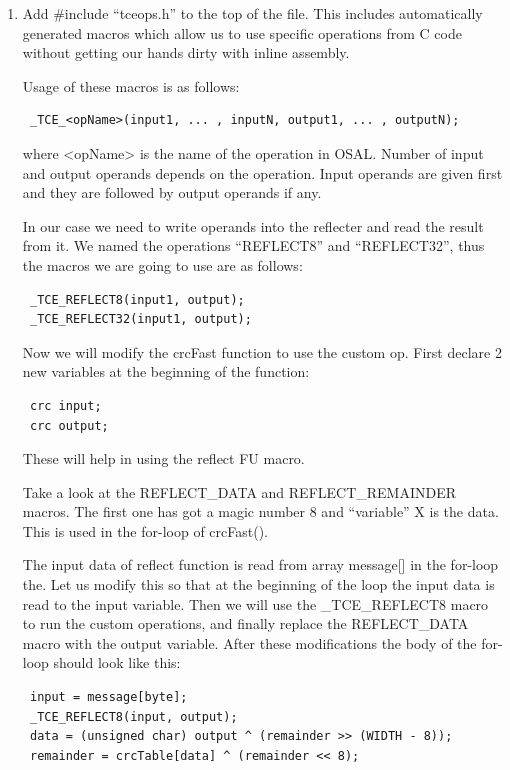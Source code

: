 \documentclass[twoside]{tceusermanual}
\begin{document}
\begin{enumerate}
\item%
Add \#include ``tceops.h'' to the top of the file. This includes 
automatically generated macros which allow us to use specific 
operations from C code without getting our hands dirty with
inline assembly.

Usage of these macros is as follows:

\begin{verbatim}
 _TCE_<opName>(input1, ... , inputN, output1, ... , outputN);
\end{verbatim}

where <opName> is the name of the operation in OSAL. Number of input and 
output operands depends on the operation. Input operands are given first 
and they are followed by output operands if any. 

In our case we need to write operands into the reflecter and read the
result from it. We named the operations ``REFLECT8'' and ``REFLECT32'', thus
the macros we are going to use are as follows:

\begin{verbatim}
 _TCE_REFLECT8(input1, output);
 _TCE_REFLECT32(input1, output);
\end{verbatim}

Now we will modify the crcFast function to use the custom op.
First declare 2 new variables at the beginning of the function:

\begin{verbatim}
 crc input;
 crc output;
\end{verbatim}

These will help in using the reflect FU macro.

Take a look at the REFLECT\_DATA and REFLECT\_REMAINDER macros. The first one
has got a magic number 8 and ``variable'' X is the data. This is used in the
for-loop of crcFast().

The input data of reflect function is read from array message[] in the for-loop the.
Let us modify this so that at the beginning of the loop the input data is
read to the input variable. Then we will use the \_TCE\_REFLECT8 macro to run
the custom operations, and finally replace the REFLECT\_DATA macro with the
output variable. After these modifications the body of the for-loop should
look like this:

\begin{verbatim}
 input = message[byte];
 _TCE_REFLECT8(input, output);
 data = (unsigned char) output ^ (remainder >> (WIDTH - 8));
 remainder = crcTable[data] ^ (remainder << 8);
\end{verbatim}


\end{enumerate}
\end{document}
